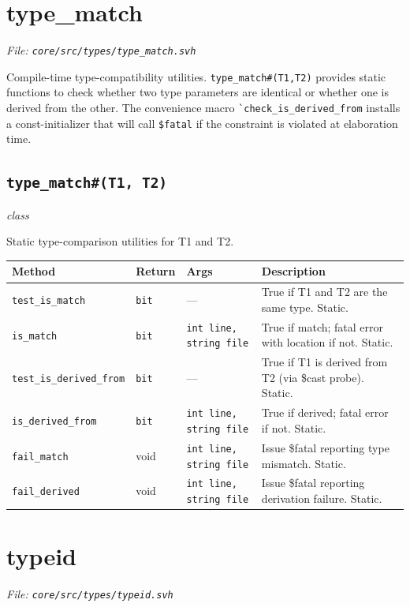 \documentclass[11pt,letterpaper]{report}
\begin{document}
\section{type\_match}
\noindent\small\textit{File: \texttt{core/src/types/type\_match.svh}}\par

Compile-time type-compatibility utilities. \texttt{type\_match\#(T1,T2)} provides static functions to check whether two type parameters are identical or whether one is derived from the other. The convenience macro \texttt{\`{}check\_is\_derived\_from} installs a const-initializer that will call \texttt{\$fatal} if the constraint is violated at elaboration time.

\subsection*{\texttt{type\_match\#(T1, T2)}}
\noindent\small\textit{class}\par

Static type-comparison utilities for T1 and T2.

\begin{xltabular}{\linewidth}{>{\small}p{1.35in} >{\small}p{1.25in} >{\small}p{0.95in} >{\small}X}
\toprule
\textbf{Method} & \textbf{Return} & \textbf{Args} & \textbf{Description} \\
\midrule
\endhead
\bottomrule
\endfoot
\texttt{test\_is\_match} & \texttt{bit} & --- & True if T1 and T2 are the same type. Static. \\
\texttt{is\_match} & \texttt{bit} & \texttt{int line, string file} & True if match; fatal error with location if not. Static. \\
\texttt{test\_is\_derived\_from} & \texttt{bit} & --- & True if T1 is derived from T2 (via \$cast probe). Static. \\
\texttt{is\_derived\_from} & \texttt{bit} & \texttt{int line, string file} & True if derived; fatal error if not. Static. \\
\texttt{fail\_match} & void & \texttt{int line, string file} & Issue \$fatal reporting type mismatch. Static. \\
\texttt{fail\_derived} & void & \texttt{int line, string file} & Issue \$fatal reporting derivation failure. Static. \\
\end{xltabular}

\section{typeid}
\noindent\small\textit{File: \texttt{core/src/types/typeid.svh}}\par
\end{document}
